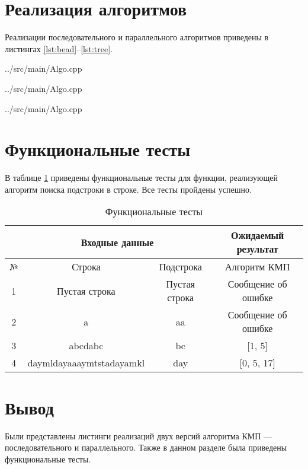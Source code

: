\section{Реализация алгоритмов}
Реализации последовательного и параллельного алгоритмов приведены в листингах \ref{lst:bead}--\ref{lst:tree}.

\begin{lstinputlisting}[
	caption={Последовательный алгоритм Кнута-Морриса-Пратта},
	label={lst:bead},
	linerange={30-58}
	]{../src/main/Algo.cpp}
\end{lstinputlisting}

\begin{lstinputlisting}[
	caption={Параллельный алгоритм Кнута-Морриса-Пратта},
	label={lst:radix},
	linerange={96-123}
	]{../src/main/Algo.cpp}
\end{lstinputlisting}

\begin{lstinputlisting}[
	caption={Задача одного потока},
	label={lst:tree},
	linerange={60-94}
	]{../src/main/Algo.cpp}
\end{lstinputlisting}




\section{Функциональные тесты}

В таблице \ref{tbl:tests} приведены функциональные тесты для функции, реализующей алгоритм поиска подстроки в строке. Все тесты пройдены успешно.

\begin{table}[h]
	\begin{center}
		\begin{threeparttable}
			\captionsetup{justification=raggedright,singlelinecheck=off}
			\caption{\label{tbl:tests} Функциональные тесты}
			\begin{tabular}{|c|c|c|c|}
				\hline
				& \multicolumn{2}{c|}{\bfseries Входные данные}& \bfseries Ожидаемый результат \\
				\hline
				№&Строка&Подстрока&Алгоритм КМП \\
				\hline
				1&Пустая строка&Пустая строка&Сообщение об ошибке\\
				\hline
				2&a&aa&Сообщение об ошибке \\
				\hline
				3&abcdabc&bc&[1, 5] \\
				\hline
				4&daymldayaaaymtstadayamkl&day&[0, 5, 17] \\
				\hline
			\end{tabular}
		\end{threeparttable}
	\end{center}
\end{table}

\section*{Вывод}

Были представлены листинги реализаций двух версий алгоритма КМП --- последовательного и параллельного. Также в данном разделе была приведены функциональные тесты.
